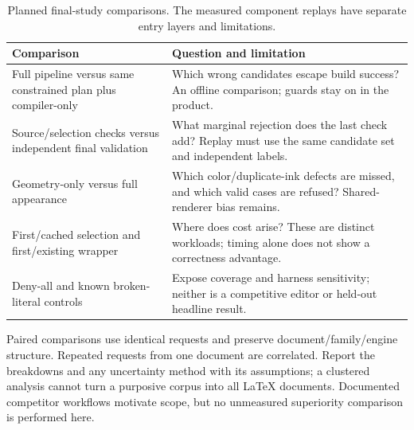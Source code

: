 \begin{table}[htbp]
\small\begin{tabularx}{\linewidth}{@{}YY@{}}
\toprule
Comparison & Question and limitation\\
\midrule
Full pipeline versus same constrained plan plus compiler-only & Which wrong candidates escape build success? An offline comparison; guards stay on in the product.\\
Source/selection checks versus independent final validation & What marginal rejection does the last check add? Replay must use the same candidate set and independent labels.\\
Geometry-only versus full appearance & Which color/duplicate-ink defects are missed, and which valid cases are refused? Shared-renderer bias remains.\\
First/cached selection and first/existing wrapper & Where does cost arise? These are distinct workloads; timing alone does not show a correctness advantage.\\
Deny-all and known broken-literal controls & Expose coverage and harness sensitivity; neither is a competitive editor or held-out headline result.\\
\bottomrule
\end{tabularx}
\caption{Planned final-study comparisons. The measured component replays have
separate entry layers and limitations.}\label{tab:comparisons}
\end{table}

Paired comparisons use identical requests and preserve document/family/engine
structure. Repeated requests from one document are correlated. Report the
breakdowns and any uncertainty method with its assumptions; a clustered
analysis cannot turn a purposive corpus into all LaTeX documents. Documented
competitor workflows motivate scope, but no unmeasured superiority comparison
is performed here.
